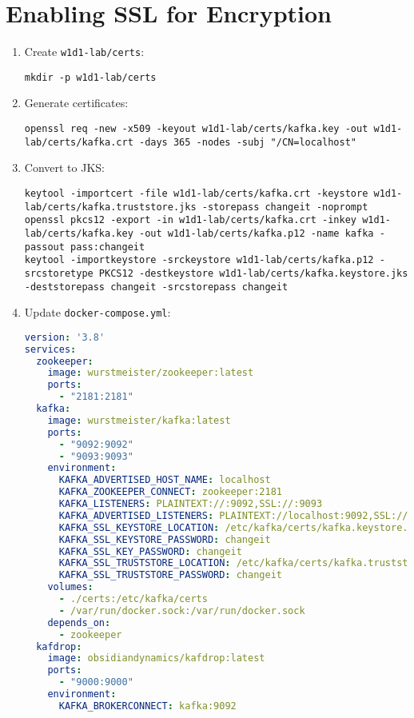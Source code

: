 \documentclass[12pt,a4paper]{report}
\begin{document}
\section{Enabling SSL for Encryption}
\begin{enumerate}
    \item Create \texttt{w1d1-lab/certs}:
    \begin{lstlisting}
mkdir -p w1d1-lab/certs
    \end{lstlisting}
    \item Generate certificates:
    \begin{lstlisting}
openssl req -new -x509 -keyout w1d1-lab/certs/kafka.key -out w1d1-lab/certs/kafka.crt -days 365 -nodes -subj "/CN=localhost"
    \end{lstlisting}
    \item Convert to JKS:
    \begin{lstlisting}
keytool -importcert -file w1d1-lab/certs/kafka.crt -keystore w1d1-lab/certs/kafka.truststore.jks -storepass changeit -noprompt
openssl pkcs12 -export -in w1d1-lab/certs/kafka.crt -inkey w1d1-lab/certs/kafka.key -out w1d1-lab/certs/kafka.p12 -name kafka -passout pass:changeit
keytool -importkeystore -srckeystore w1d1-lab/certs/kafka.p12 -srcstoretype PKCS12 -destkeystore w1d1-lab/certs/kafka.keystore.jks -deststorepass changeit -srcstorepass changeit
    \end{lstlisting}
    \item Update \texttt{docker-compose.yml}:
\begin{lstlisting}[language=yaml]
version: '3.8'
services:
  zookeeper:
    image: wurstmeister/zookeeper:latest
    ports:
      - "2181:2181"
  kafka:
    image: wurstmeister/kafka:latest
    ports:
      - "9092:9092"
      - "9093:9093"
    environment:
      KAFKA_ADVERTISED_HOST_NAME: localhost
      KAFKA_ZOOKEEPER_CONNECT: zookeeper:2181
      KAFKA_LISTENERS: PLAINTEXT://:9092,SSL://:9093
      KAFKA_ADVERTISED_LISTENERS: PLAINTEXT://localhost:9092,SSL://localhost:9093
      KAFKA_SSL_KEYSTORE_LOCATION: /etc/kafka/certs/kafka.keystore.jks
      KAFKA_SSL_KEYSTORE_PASSWORD: changeit
      KAFKA_SSL_KEY_PASSWORD: changeit
      KAFKA_SSL_TRUSTSTORE_LOCATION: /etc/kafka/certs/kafka.truststore.jks
      KAFKA_SSL_TRUSTSTORE_PASSWORD: changeit
    volumes:
      - ./certs:/etc/kafka/certs
      - /var/run/docker.sock:/var/run/docker.sock
    depends_on:
      - zookeeper
  kafdrop:
    image: obsidiandynamics/kafdrop:latest
    ports:
      - "9000:9000"
    environment:
      KAFKA_BROKERCONNECT: kafka:9092

\end{lstlisting}
\end{enumerate}
\end{document}

